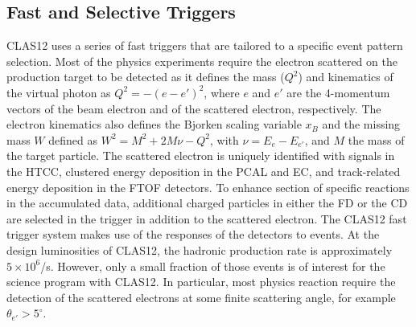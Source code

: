 \documentclass[final,3p,twocolumn]{elsarticle}
\begin{document}
\subsection{Fast and Selective Triggers} 

CLAS12 uses a series of fast triggers that are tailored to a specific event pattern selection. Most of 
the physics experiments require the electron scattered on the production target to be detected as it defines
the mass ($Q^2$) and kinematics of the virtual photon as $Q^2 = -(e - e')^2$, where $e$ and $e'$ are 
the 4-momentum vectors of the beam electron and of the scattered electron, respectively. The electron kinematics 
also defines the Bjorken scaling variable $x_B$  and the missing mass $W$ defined as $W^2 = M^2 + 2M\nu - Q^2$,
with $\nu = E_e - E_{e'}$, and $M$ the mass of the target particle. The scattered electron is uniquely identified
with signals in the HTCC, clustered energy deposition  in the PCAL and EC, and track-related energy deposition 
in the FTOF detectors. To enhance section of specific reactions in the accumulated data, additional charged particles
in either the FD or the CD are selected in the trigger in addition to the scattered electron. The CLAS12 fast trigger
system makes use of the responses of the detectors to events. At the design luminosities of CLAS12, the hadronic
production rate is approximately $5 \times 10^6$/s. However, only a small fraction of those events is of interest for
the science program with CLAS12. In particular, most physics reaction require the detection of the scattered electrons
at some finite scattering angle, for example $\theta_{e'} > 5^\circ$.  
   
\end{document}
